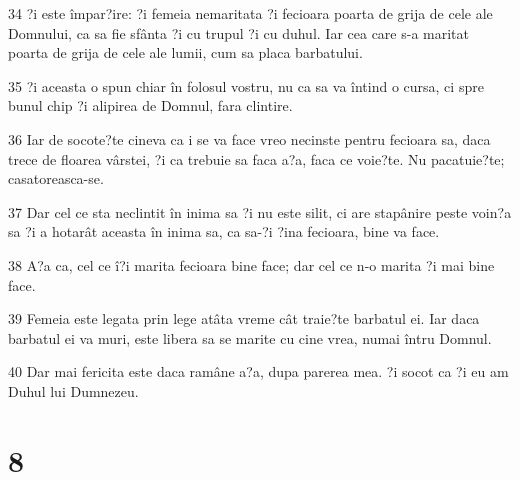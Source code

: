 \par 34 ?i este împar?ire: ?i femeia nemaritata ?i fecioara poarta de grija de cele ale Domnului, ca sa fie sfânta ?i cu trupul ?i cu duhul. Iar cea care s-a maritat poarta de grija de cele ale lumii, cum sa placa barbatului.
\par 35 ?i aceasta o spun chiar în folosul vostru, nu ca sa va întind o cursa, ci spre bunul chip ?i alipirea de Domnul, fara clintire.
\par 36 Iar de socote?te cineva ca i se va face vreo necinste pentru fecioara sa, daca trece de floarea vârstei, ?i ca trebuie sa faca a?a, faca ce voie?te. Nu pacatuie?te; casatoreasca-se.
\par 37 Dar cel ce sta neclintit în inima sa ?i nu este silit, ci are stapânire peste voin?a sa ?i a hotarât aceasta în inima sa, ca sa-?i ?ina fecioara, bine va face.
\par 38 A?a ca, cel ce î?i marita fecioara bine face; dar cel ce n-o marita ?i mai bine face.
\par 39 Femeia este legata prin lege atâta vreme cât traie?te barbatul ei. Iar daca barbatul ei va muri, este libera sa se marite cu cine vrea, numai întru Domnul.
\par 40 Dar mai fericita este daca ramâne a?a, dupa parerea mea. ?i socot ca ?i eu am Duhul lui Dumnezeu.

\chapter{8}


